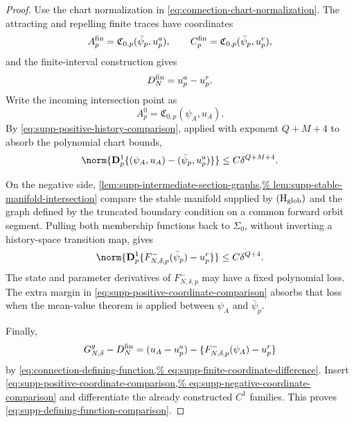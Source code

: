 \begin{proof}
Use the chart normalization in
\cref{eq:connection-chart-normalization}.  The attracting and repelling
finite traces have coordinates
\[
 A_p^{\rm fin}=\mathfrak C_{0,p}(\bar\psi_p,u_p^a),
 \qquad
 C_p^{\rm fin}=\mathfrak C_{0,p}(\bar\psi_p,u_p^r),
\]
and the finite-interval construction gives
\begin{equation}
 D_N^{\rm fin}=u_p^a-u_p^r.
 \label{eq:supp-finite-coordinate-difference}
\end{equation}
Write the incoming intersection point as
\[
 A_p^0=\mathfrak C_{0,p}(\psi_A,u_A).
\]
By \cref{eq:supp-positive-history-comparison}, applied with exponent
\(Q+M+4\) to absorb the polynomial chart bounds,
\begin{equation}
 \norm{\mathbf D_p^1
   \{(\psi_A,u_A)-(\bar\psi_p,u_p^a)\}}
 \le C\delta^{Q+M+4}.
 \label{eq:supp-positive-coordinate-comparison}
\end{equation}

On the negative side,
\cref{lem:supp-intermediate-section-graphs,%
lem:supp-stable-manifold-intersection} compare the stable manifold supplied by
\(\mathrm{(H_{\rm glob})}\) and the graph defined by the truncated boundary
condition on a common forward orbit segment.  Pulling both
membership functions back to \(\Sigma_0\), without inverting a history-space
transition map, gives
\begin{equation}
 \norm{\mathbf D_p^1
   \{F_{N,\delta,p}^-(\bar\psi_p)-u_p^r\}}
 \le C\delta^{Q+4}.
 \label{eq:supp-negative-coordinate-comparison}
\end{equation}
The state and parameter derivatives of \(F_{N,\delta,p}^-\) may have a
fixed polynomial loss.  The extra margin in
\cref{eq:supp-positive-coordinate-comparison} absorbs that loss when the
mean-value theorem is applied between \(\psi_A\) and \(\bar\psi_p\).

Finally,
\[
 G_{N,\delta}^{g}-D_N^{\rm fin}
 =(u_A-u_p^a)
  -\{F_{N,\delta,p}^-(\psi_A)-u_p^r\}
\]
by \cref{eq:connection-defining-function,%
eq:supp-finite-coordinate-difference}.  Insert
\cref{eq:supp-positive-coordinate-comparison,%
eq:supp-negative-coordinate-comparison} and differentiate the already
constructed \(C^1\) families.  This proves
\cref{eq:supp-defining-function-comparison}.
\end{proof}

